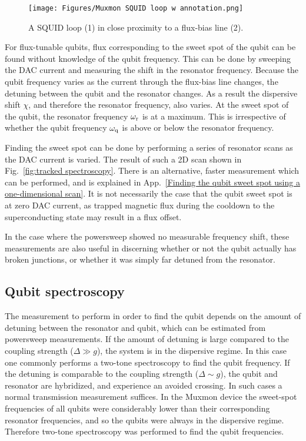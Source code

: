         \begin{figure}
          \begin{center}
          \vspace{-30pt}
            \texttt{[image: Figures/Muxmon SQUID loop w annotation.png]}
          \end{center}
          \vspace{-20 pt}
          \caption{A SQUID loop (1) in close proximity to a flux-bias line (2).}
          \label{fig:SQUID loop}
        \end{figure}
        For flux-tunable qubits, flux corresponding to the sweet spot of the qubit can be found without knowledge of the qubit frequency. This can be done by sweeping the DAC current and measuring the shift in the resonator frequency. Because the qubit frequency varies as the current through the flux-bias line changes, the detuning between the qubit and the resonator changes. As a result the dispersive shift $\chi$, and therefore the resonator frequency, also varies. At the sweet spot of the qubit, the resonator frequency $\omega_\text{r}$ is at a maximum. This is irrespective of whether the qubit frequency $\omega_\text{q}$ is above or below the resonator frequency.

        Finding the sweet spot can be done by performing a series of resonator scans as the DAC current is varied. The result of such a 2D scan shown in Fig.~\ref{fig:tracked spectroscopy}. There is an alternative, faster measurement which can be performed, and is explained in App.~\ref{Finding the qubit sweet spot using a one-dimensional scan}. It is not necessarily the case that the qubit sweet spot is at zero DAC current, as trapped magnetic flux during the cooldown to the superconducting state may result in a flux offset.

        In the case where the powersweep showed no measurable frequency shift, these measurements are also useful in discerning whether or not the qubit actually has broken junctions, or whether it was simply far detuned from the resonator.

      \subsection{Qubit spectroscopy}
        \label{sec:spectroscopy}

        The measurement to perform in order to find the qubit depends on the amount of detuning between the resonator and qubit, which can be estimated from powersweep measurements. If the amount of detuning is large compared to the coupling strength ($\Delta \gg  g$), the system is in the dispersive regime. In this case one commonly performs a two-tone spectroscopy to find the qubit frequency. If the detuning is comparable to the coupling strength ($\Delta \sim g$), the qubit and resonator are hybridized, and experience an avoided crossing. In such cases a normal transmission measurement suffices. In the Muxmon device the sweet-spot frequencies of all qubits were considerably lower than their corresponding resonator frequencies, and so the qubits were always in the dispersive regime. Therefore two-tone spectroscopy was performed to find the qubit frequencies.

